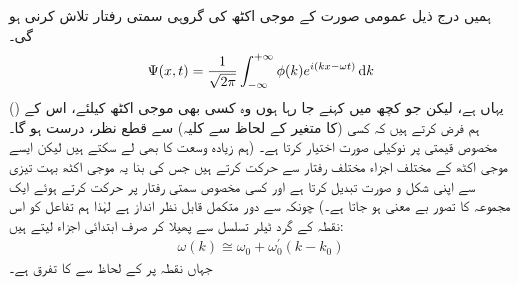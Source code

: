  ہمیں درج ذیل عمومی صورت کے موجی اکٹھ کی گروہی سمتی رفتار تلاش کرنی ہو گی۔ 
\begin{align*}
\Psi (x,t) = \frac{1}{\sqrt{2\pi}} \int_{- \infty}^{+ \infty} \phi (k) e^{i(kx - \omega t)} \dif k
\end{align*}
 (یہاں  ہے، لیکن جو کچھ میں کہنے جا رہا ہوں وہ کسی بھی موجی اکٹھ کیلئے، اس کے  ( کا متغیر  کے لحاظ سے کلیہ) سے قطع نظر،  درست ہو گا۔)  ہم فرض کرتے ہیں کہ کسی مخصوص قیمتی  پر   نوکیلی صورت اختیار کرتا ہے۔ (ہم زیادہ وسعت کا  بھی لے سکتے ہیں لیکن ایسے موجی اکٹھ کے مختلف اجزاء مختلف رفتار سے حرکت کرتے ہیں جس کی بنا یہ موجی اکٹھ بہت تیزی سے اپنی شکل و صورت تبدیل کرتا ہے اور کسی مخصوص سمتی رفتار پر حرکت کرتے ہوئے ایک مجموعہ  کا تصور بے معنی ہو جاتا ہے۔) چونکہ   سے دور متکمل قابل نظر انداز ہے لہٰذا ہم تفاعل  کو اس نقطہ کے گرد ٹیلر تسلسل سے پھیلا کر صرف ابتدائی اجزاء لیتے ہیں:
\begin{align*}
\omega (k) \cong \omega_{0} + \omega_{0}^{'} (k-k_{0})
\end{align*}
 جہاں نقطہ  پر  کے لحاظ سے  کا تفرق  ہے۔
 
